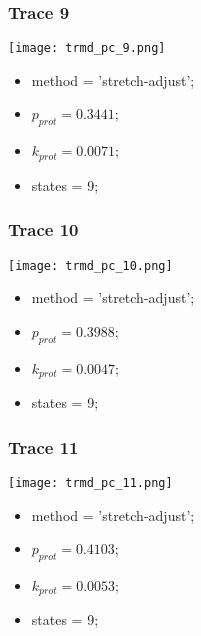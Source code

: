 \subsubsection{Trace 9}
\begin{minipage}[c]{0.7\textwidth}
	\texttt{[image: trmd\_pc\_9.png]}
\end{minipage}
\hfill
\begin{minipage}[c]{0.45\textwidth}
	\begin{itemize}
		\item method = 'stretch-adjust';
		\item $p_{prot}=0.3441$;
		\item $k_{prot}=0.0071$;
		\item states = 9;
	\end{itemize}
\end{minipage}

\subsubsection{Trace 10}
\begin{minipage}[c]{0.7\textwidth}
	\texttt{[image: trmd\_pc\_10.png]}
\end{minipage}
\hfill
\begin{minipage}[c]{0.45\textwidth}
	\begin{itemize}
		\item method = 'stretch-adjust';
		\item $p_{prot}=0.3988$;
		\item $k_{prot}=0.0047$;
		\item states = 9;
	\end{itemize}
\end{minipage}

\subsubsection{Trace 11}
\begin{minipage}[c]{0.7\textwidth}
	\texttt{[image: trmd\_pc\_11.png]}
\end{minipage}
\hfill
\begin{minipage}[c]{0.45\textwidth}
	\begin{itemize}
		\item method = 'stretch-adjust';
		\item $p_{prot}=0.4103$;
		\item $k_{prot}=0.0053$;
		\item states = 9;
	\end{itemize}
\end{minipage}

